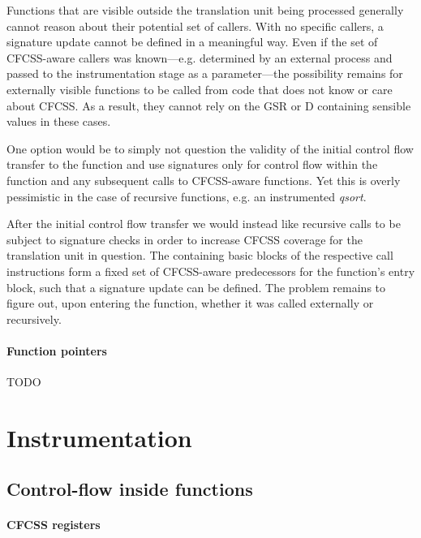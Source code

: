 Functions that are visible outside the translation unit being processed
generally cannot reason about their potential set of callers. With no specific
callers, a signature update cannot be defined in a meaningful way. Even if the
set of CFCSS-aware callers was known—e.g. determined by an external
process and passed to the instrumentation stage as a parameter—the possibility
remains for externally visible functions to be called from code that does not
know or care about CFCSS. As a result, they cannot rely on the GSR or
D containing sensible values in these cases.

One option would be to simply not question the validity of the initial control
flow transfer to the function and use signatures only for control flow within
the function and any subsequent calls to CFCSS-aware functions. Yet this is
overly pessimistic in the case of recursive functions, e.g. an instrumented
\emph{qsort}.

After the initial control flow transfer we would instead like recursive calls
to be subject to signature checks in order to increase CFCSS coverage for the
translation unit in question. The containing basic blocks of the respective
call instructions form a fixed set of CFCSS-aware predecessors for the
function's entry block, such that a signature update can be defined. The
problem remains to figure out, upon entering the function, whether it was
called externally or recursively.


\paragraph{Function pointers} TODO


\section{Instrumentation}


\subsection{Control-flow inside functions}

\paragraph{CFCSS registers}

